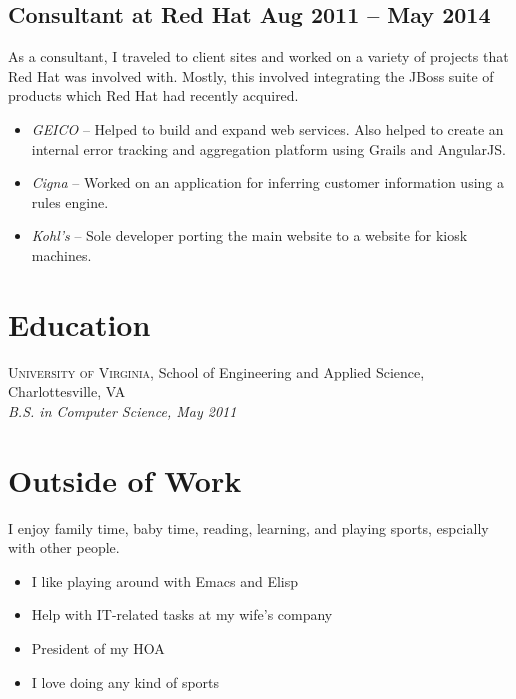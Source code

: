 \documentclass[12pt]{article}
\begin{document}
     
\tag{\LaTeX}

\subsection*{Consultant at Red Hat \hfill Aug 2011 -- May 2014}

As a consultant, I traveled to client sites and worked on a variety of projects
that Red Hat was involved with. Mostly, this involved integrating the JBoss
suite of products which Red Hat had recently acquired.

\begin{itemize}
\item \textit{GEICO} -- Helped to build and expand web services. Also helped to
  create an internal error tracking and aggregation platform using Grails and
  AngularJS.

\item \textit{Cigna} -- Worked on an application for inferring customer
  information using a rules engine.

\item \textit{Kohl's} -- Sole developer porting the main website to a website
  for kiosk machines.

\end{itemize}

    
  


\section*{Education}

\textsc{University of Virginia}, School of Engineering and Applied Science,
Charlottesville, VA \\
\textit{B.S. in Computer Science, May 2011}


\section*{Outside of Work}

I enjoy family time, baby time, reading, learning, and playing sports, espcially
with other people.

\begin{itemize}
\item I like playing around with Emacs and Elisp
\item Help with IT-related tasks at my wife's company
\item President of my HOA
\item I love doing any kind of sports
\end{itemize}
\end{document}
